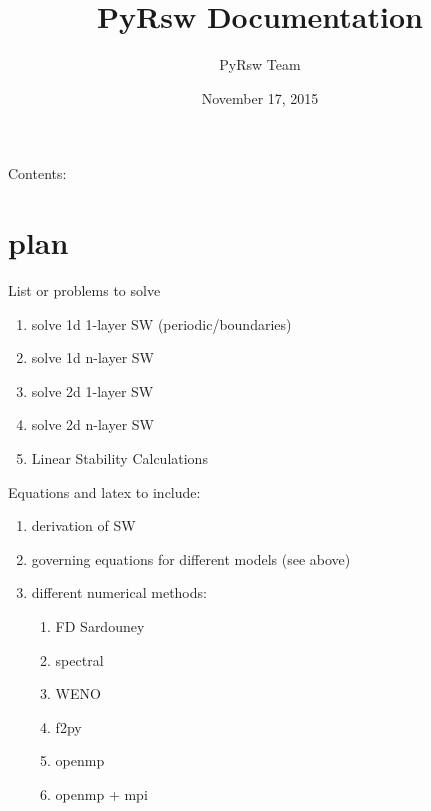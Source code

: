\documentclass[letterpaper,10pt,english]{sphinxmanual}
\title{PyRsw Documentation}
\date{November 17, 2015}
\author{PyRsw Team}
\begin{document}
\maketitle
\tableofcontents
{}\label{index::doc}


Contents:


\chapter{plan}
\label{plan:welcome-to-pysw-s-documentation}\label{plan::doc}\label{plan:plan}
List or problems to solve
\begin{enumerate}
\item {} 
solve 1d 1-layer SW (periodic/boundaries)

\item {} 
solve 1d n-layer SW

\item {} 
solve 2d 1-layer SW

\item {} 
solve 2d n-layer SW

\item {} 
Linear Stability Calculations

\end{enumerate}

Equations and latex to include:
\begin{enumerate}
\item {} 
derivation of SW

\item {} 
governing equations for different models (see above)

\item {} 
different numerical methods:
\begin{enumerate}
\item {} 
FD Sardouney

\item {} 
spectral

\item {} 
WENO

\item {} 
f2py

\item {} 
openmp

\item {} 
openmp + mpi

\end{enumerate}

\end{enumerate}
\end{document}
